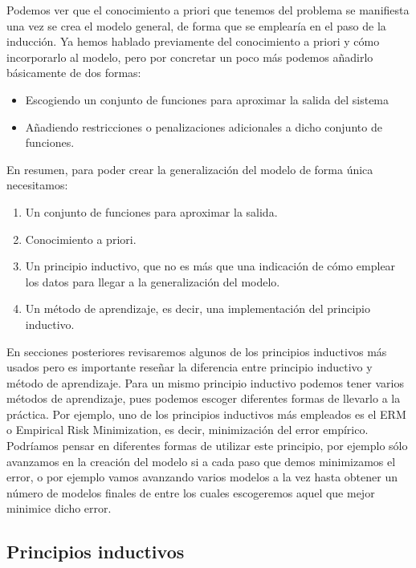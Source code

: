 Podemos ver que el conocimiento a priori que tenemos del problema se manifiesta una vez se crea el modelo general, de forma que se emplearía en el paso de la inducción. Ya hemos hablado previamente del conocimiento a priori y cómo incorporarlo al modelo, pero por concretar un poco más podemos añadirlo básicamente de dos formas:

\begin{itemize}
	\item Escogiendo un conjunto de funciones para aproximar la salida del sistema
	\item Añadiendo restricciones o penalizaciones adicionales a dicho conjunto de funciones.
\end{itemize}

En resumen, para poder crear la generalización del modelo de forma única necesitamos:

\begin{enumerate}
	\item Un conjunto de funciones para aproximar la salida.
	\item Conocimiento a priori.
	\item Un principio inductivo, que no es más que una indicación de cómo emplear los datos para llegar a la generalización del modelo.
	\item Un método de aprendizaje, es decir, una implementación del principio inductivo.
\end{enumerate}

En secciones posteriores revisaremos algunos de los principios inductivos más usados pero es importante reseñar la diferencia entre principio inductivo y método de aprendizaje. Para un mismo principio inductivo podemos tener varios métodos de aprendizaje, pues podemos escoger diferentes formas de llevarlo a la práctica. Por ejemplo, uno de los principios inductivos más empleados es el ERM o Empirical Risk Minimization, es decir, minimización del error empírico. Podríamos pensar en diferentes formas de utilizar este principio, por ejemplo sólo avanzamos en la creación del modelo si a cada paso que demos minimizamos el error, o por ejemplo vamos avanzando varios modelos a la vez hasta obtener un número de modelos finales de entre los cuales escogeremos aquel que mejor minimice dicho error.

\subsection{Principios inductivos}

